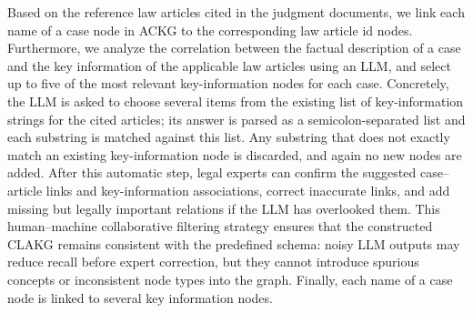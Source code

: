 \documentclass[review,times,nonatbib]{elsarticle} %
\renewcommand{\textcolor}[2]{#2}
\begin{document}
\textcolor{blue}{Based on the reference law articles cited in the judgment documents, we link each name of a case node in ACKG to the corresponding law article id nodes. Furthermore, we analyze the correlation between the factual description of a case and the key information of the applicable law articles using an LLM, and select up to five of the most relevant key-information nodes for each case. Concretely, the LLM is asked to choose several items from the existing list of key-information strings for the cited articles; its answer is parsed as a semicolon-separated list and each substring is matched against this list. Any substring that does not exactly match an existing key-information node is discarded, and again no new nodes are added. After this automatic step, legal experts can confirm the suggested case–article links and key-information associations, correct inaccurate links, and add missing but legally important relations if the LLM has overlooked them. This human–machine collaborative filtering strategy ensures that the constructed CLAKG remains consistent with the predefined schema: noisy LLM outputs may reduce recall before expert correction, but they cannot introduce spurious concepts or inconsistent node types into the graph. Finally, each name of a case node is linked to several key information nodes.}



\end{document}
